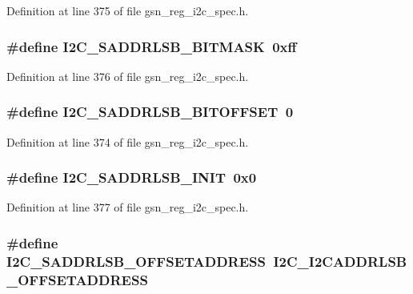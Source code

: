 Definition at line 375 of file gsn\_\-reg\_\-i2c\_\-spec.h.

\hypertarget{a00558_a1ddb8da00e54b366483b6517cc51daf5}{
\subsubsection[{I2C\_\-SADDRLSB\_\-BITMASK}]{\setlength{\rightskip}{0pt plus 5cm}\#define I2C\_\-SADDRLSB\_\-BITMASK~0xff}}
\label{a00558_a1ddb8da00e54b366483b6517cc51daf5}


Definition at line 376 of file gsn\_\-reg\_\-i2c\_\-spec.h.

\hypertarget{a00558_a48fb6df5ede5f01b1d6163e7284fe678}{
\subsubsection[{I2C\_\-SADDRLSB\_\-BITOFFSET}]{\setlength{\rightskip}{0pt plus 5cm}\#define I2C\_\-SADDRLSB\_\-BITOFFSET~0}}
\label{a00558_a48fb6df5ede5f01b1d6163e7284fe678}


Definition at line 374 of file gsn\_\-reg\_\-i2c\_\-spec.h.

\hypertarget{a00558_a46e66a82cf6769b26a5df0131a9329af}{
\subsubsection[{I2C\_\-SADDRLSB\_\-INIT}]{\setlength{\rightskip}{0pt plus 5cm}\#define I2C\_\-SADDRLSB\_\-INIT~0x0}}
\label{a00558_a46e66a82cf6769b26a5df0131a9329af}


Definition at line 377 of file gsn\_\-reg\_\-i2c\_\-spec.h.

\hypertarget{a00558_abe808ef4b9bafe94833885f7ec15d731}{
\subsubsection[{I2C\_\-SADDRLSB\_\-OFFSETADDRESS}]{\setlength{\rightskip}{0pt plus 5cm}\#define I2C\_\-SADDRLSB\_\-OFFSETADDRESS~I2C\_\-I2CADDRLSB\_\-OFFSETADDRESS}}
\label{a00558_abe808ef4b9bafe94833885f7ec15d731}


